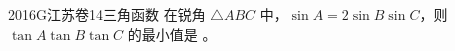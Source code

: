 
\begin{problem}{2016}{G}{江苏卷}{14}{三角函数}
在锐角 $\triangle ABC$ 中，$\sin A = 2\sin B\sin C$，则 $\tan A\tan B\tan C$ 的最小值是 \underline{\hspace{4em}}。
\end{problem}